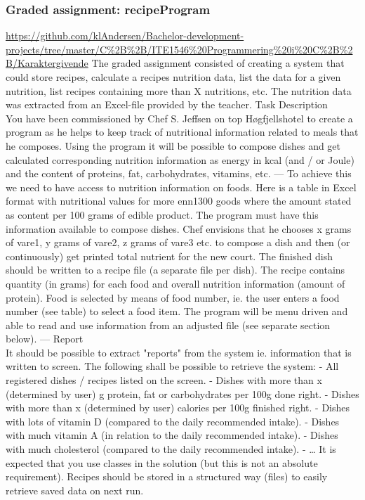 \subsubsection{Graded assignment: recipeProgram} %
\label{sec:recipe_program}
 \url{https://github.com/klAndersen/Bachelor-development-projects/tree/master/C%2B%2B/ITE1546%20Programmering%20i%20C%2B%2B/Karaktergivende}
The graded assignment consisted of creating a system that could store recipes, calculate a recipes nutrition data, list the data for a given nutrition, 
list recipes containing more than X nutritions, etc. 
The nutrition data was extracted from an Excel-file provided by the teacher.
\vspace{0.5em}\newline
Task Description \\
You have been commissioned by Chef S. Jeffsen on top Høgfjellshotel to create a program as he helps to keep track of nutritional information related to meals that he composes. 
Using the program it will be possible to compose dishes and get calculated corresponding nutrition information as energy in kcal (and / or Joule) and the content of proteins,
fat, carbohydrates, vitamins, etc.
---
To achieve this we need to have access to nutrition information on foods.
Here is a table in Excel format with nutritional values for more enn1300 goods where the amount stated as content per 100 grams of edible product.
The program must have this information available to compose dishes.
Chef envisions that he chooses x grams of vare1, y grams of vare2, z grams of vare3 etc. to compose a dish and then (or continuously) get printed total nutrient for the new court. 
The finished dish should be written to a recipe file (a separate file per dish). 
The recipe contains quantity (in grams) for each food and overall nutrition information (amount of protein). 
Food is selected by means of food number, ie. the user enters a food number (see table) to select a food item. 
The program will be menu driven and able to read and use information from an adjusted file (see separate section below).
---
Report \\
It should be possible to extract "reports" from the system ie. information that is written to screen. 
The following shall be possible to retrieve the system:
- All registered dishes / recipes listed on the screen.
- Dishes with more than x (determined by user) g protein, fat or carbohydrates per 100g done right.
- Dishes with more than x (determined by user) calories per 100g finished right.
- Dishes with lots of vitamin D (compared to the daily recommended intake).
- Dishes with much vitamin A (in relation to the daily recommended intake).
- Dishes with much cholesterol (compared to the daily recommended intake).
- \ldots
It is expected that you use classes in the solution (but this is not an absolute requirement). 
Recipes should be stored in a structured way (files) to easily retrieve saved data on next run.


